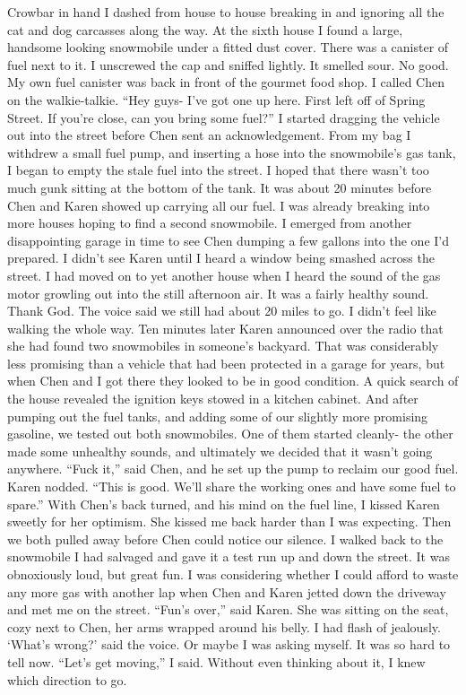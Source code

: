 \documentclass[a4paper]{article}
\begin{document}
Crowbar in hand I dashed from house to house breaking in and ignoring all the cat and dog carcasses along the way. At the sixth house I found a large, handsome looking snowmobile under a fitted dust cover.
There was a canister of fuel next to it. I unscrewed the cap and sniffed lightly. It smelled sour. No good.
My own fuel canister was back in front of the gourmet food shop. I called Chen on the walkie-talkie. “Hey guys- I’ve got one up here. First left off of Spring Street. If you’re close, can you bring some fuel?”
I started dragging the vehicle out into the street before Chen sent an acknowledgement. From my bag I withdrew a small fuel pump, and inserting a hose into the snowmobile’s gas tank, I began to empty the stale fuel into the street. I hoped that there wasn’t too much gunk sitting at the bottom of the tank.
It was about 20 minutes before Chen and Karen showed up carrying all our fuel. I was already breaking into more houses hoping to find a second snowmobile. I emerged from another disappointing garage in time to see Chen dumping a few gallons into the one I’d prepared. I didn’t see Karen until I heard a window being smashed across the street.
I had moved on to yet another house when I heard the sound of the gas motor growling out into the still afternoon air. It was a fairly healthy sound. Thank God. The voice said we still had about 20 miles to go. I didn’t feel like walking the whole way.
Ten minutes later Karen announced over the radio that she had found two snowmobiles in someone’s backyard. That was considerably less promising than a vehicle that had been protected in a garage for years, but when Chen and I got there they looked to be in good condition.
A quick search of the house revealed the ignition keys stowed in a kitchen cabinet. And after pumping out the fuel tanks, and adding some of our slightly more promising gasoline, we tested out both snowmobiles. One of them started cleanly- the other made some unhealthy sounds, and ultimately we decided that it wasn’t going anywhere.
“Fuck it,” said Chen, and he set up the pump to reclaim our good fuel.
Karen nodded. “This is good. We’ll share the working ones and have some fuel to spare.”
With Chen’s back turned, and his mind on the fuel line, I kissed Karen sweetly for her optimism. She kissed me back harder than I was expecting. Then we both pulled away before Chen could notice our silence.
I walked back to the snowmobile I had salvaged and gave it a test run up and down the street. It was obnoxiously loud, but great fun. I was considering whether I could afford to waste any more gas with another lap when Chen and Karen jetted down the driveway and met me on the street.
“Fun’s over,” said Karen. She was sitting on the seat, cozy next to Chen, her arms wrapped around his belly. I had flash of jealously.
‘What’s wrong?’ said the voice. Or maybe I was asking myself. It was so hard to tell now.
“Let’s get moving,” I said. Without even thinking about it, I knew which direction to go.
\end{document}
